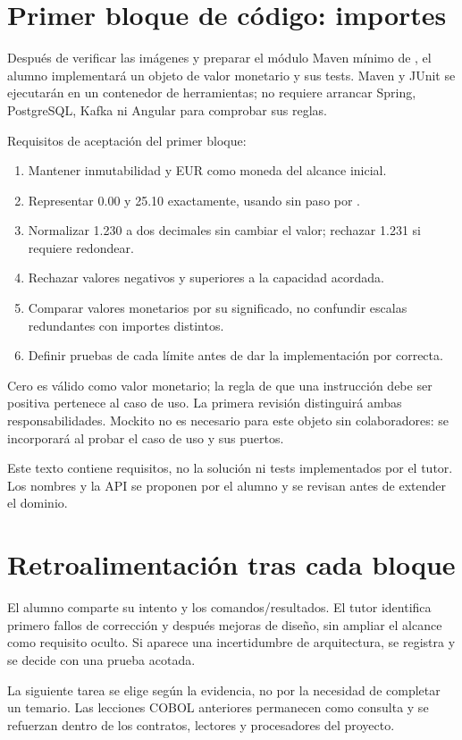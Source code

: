 \section{Primer bloque de código: importes}
Después de verificar las imágenes y preparar el módulo Maven mínimo de , el alumno implementará un objeto de valor monetario y sus tests. Maven y JUnit se ejecutarán en un contenedor de herramientas; no requiere arrancar Spring, PostgreSQL, Kafka ni Angular para comprobar sus reglas.

Requisitos de aceptación del primer bloque:
\begin{enumerate}
\item Mantener inmutabilidad y EUR como moneda del alcance inicial.
\item Representar 0.00 y 25.10 exactamente, usando  sin paso por .
\item Normalizar 1.230 a dos decimales sin cambiar el valor; rechazar 1.231 si requiere redondear.
\item Rechazar valores negativos y superiores a la capacidad acordada.
\item Comparar valores monetarios por su significado, no confundir escalas redundantes con importes distintos.
\item Definir pruebas de cada límite antes de dar la implementación por correcta.
\end{enumerate}

Cero es válido como valor monetario; la regla de que una instrucción debe ser positiva pertenece al caso de uso. La primera revisión distinguirá ambas responsabilidades. Mockito no es necesario para este objeto sin colaboradores: se incorporará al probar el caso de uso y sus puertos.

Este texto contiene requisitos, no la solución ni tests implementados por el tutor. Los nombres y la API se proponen por el alumno y se revisan antes de extender el dominio.

\section{Retroalimentación tras cada bloque}
El alumno comparte su intento y los comandos/resultados. El tutor identifica primero fallos de corrección y después mejoras de diseño, sin ampliar el alcance como requisito oculto. Si aparece una incertidumbre de arquitectura, se registra y se decide con una prueba acotada.

La siguiente tarea se elige según la evidencia, no por la necesidad de completar un temario. Las lecciones COBOL anteriores permanecen como consulta y se refuerzan dentro de los contratos, lectores y procesadores del proyecto.
